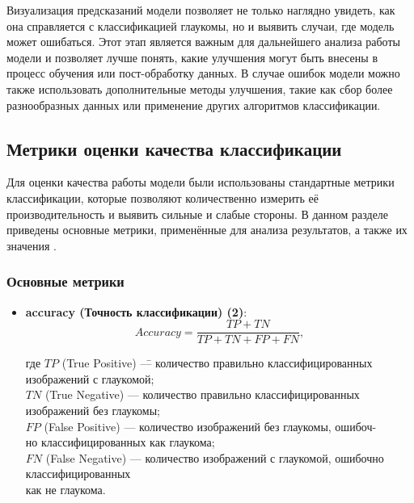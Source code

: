 {    Визуализация предсказаний модели позволяет не только наглядно увидеть, как она справляется с классификацией глаукомы, но и выявить случаи, где модель может ошибаться. Этот этап является важным для дальнейшего анализа работы модели и позволяет лучше понять, какие улучшения могут быть внесены в процесс обучения или пост-обработку данных. В случае ошибок модели можно также использовать дополнительные методы улучшения, такие как сбор более разнообразных данных или применение других алгоритмов классификации.


    \subsection{Метрики оценки качества классификации}

    Для оценки качества работы модели были использованы стандартные метрики классификации, которые позволяют количественно измерить её производительность и выявить сильные и слабые стороны. В данном разделе приведены основные метрики, применённые для анализа результатов, а также их значения \cite{metrics}.

    \subsubsection*{Основные метрики}

    \begin{itemize}
        \item \textbf{accuracy (Точность классификации) (2)}:
            \[
            Accuracy = \frac{TP + TN}{TP + TN + FP + FN}, \tag{2}
            \]
            \begin{tabbing}
                где 
                \=\(TP\) (True Positive) \= — количество правильно классифицированных \\ изображений с глаукомой; \\
                \>\(TN\) (True Negative) \> — количество правильно классифицированных \\ изображений без глаукомы; \\
                \>\(FP\) (False Positive) \> — количество изображений без глаукомы, ошибоч- \\ но классифицированных как глаукома; \\
                \>\(FN\) (False Negative) \> — количество изображений с глаукомой, ошибочно \\ классифицированных \\ как не глаукома.
            \end{tabbing}
        

\end{itemize}}
